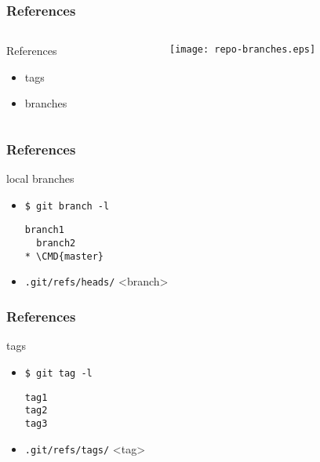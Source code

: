 \documentclass[english]{beamer}
\newcommand{\CMD}[1]{%
\texttt{\textcolor{code-blue}{#1}}%
}
\newcommand{\cmd}[1]{%
\texttt{\textcolor{code-orange}{#1}}%
}
\begin{document}
\begin{frame}
\frametitle{References}
\begin{columns}[t]
        \begin{column}[T]{.5\textwidth}
                References
                \begin{itemize}
                        \item tags
                        \item branches
                \end{itemize}
        \end{column}
        \begin{column}[T]{.5\textwidth}
                \texttt{[image: repo-branches.eps]}
        \end{column}
\end{columns}

\end{frame}

\begin{frame}[fragile]
\frametitle{References}
local branches
\begin{itemize}
        \item \CMD{\$ git branch -l} \\
                {\small
                \begin{Verbatim}[commandchars=\\\{\}]
  branch1
  branch2
* \CMD{master}
                \end{Verbatim}
                }
        \item \cmd{.git/refs/heads/}<branch>
\end{itemize}
\end{frame}

\begin{frame}[fragile]
\frametitle{References}
tags
\begin{itemize}
        \item \CMD{\$ git tag -l} \\
                {\small
                \begin{Verbatim}[commandchars=\\\{\}]
tag1
tag2
tag3
                \end{Verbatim}
                }
        \item \cmd{.git/refs/tags/}<tag>
\end{itemize}
\end{frame}
\end{document}

